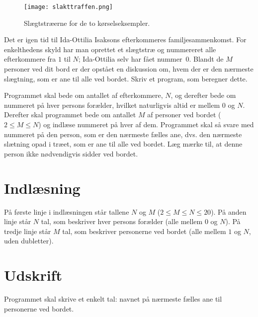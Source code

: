 \begin{figure}[h!]
  \centering
  \texttt{[image: slakttraffen.png]}
  \caption{Slægtstræerne for de to kørselseksempler.}
\end{figure}

Det er igen tid til Ida-Ottilia Isaksons efterkommeres familjesammenkomst. 
For enkelthedens skyld har man oprettet et slægtstræ og nummereret alle efterkommere fra $1$ til $N$; Ida-Ottilia selv har fået nummer~$0$.
Blandt de $M$ personer ved dit bord er der opstået en diskussion om, hvem der er den nærmeste slægtning, som er ane til alle ved bordet.
Skriv et program, som beregner dette.

Programmet skal bede om antallet af efterkommere, $N$, og derefter bede om nummeret på hver persons forælder, hvilket naturligvis altid er mellem $0$ og $N$.
Derefter skal programmet bede om antallet $M$ af personer ved bordet ($2 \le M \le N$) og indlæse nummeret på hver af dem.
Programmet skal så svare med nummeret på den person, som er den nærmeste fælles ane, dvs. den nærmeste slætning opad i træet, som er ane til alle ved bordet.
Læg mærke til, at denne person ikke nødvendigvis sidder ved bordet.

\section*{Indlæsning}
På første linje i indlæsningen står tallene $N$ og $M$ ($2 \le M \le N \le 20$).
På anden linje står $N$ tal, som beskriver hver persons forælder (alle mellem $0$ og $N$).
På tredje linje står $M$ tal, som beskriver personerne ved bordet (alle mellem $1$ og $N$, uden dubletter).

\section*{Udskrift}
Programmet skal skrive et enkelt tal: navnet på nærmeste fælles ane til personerne ved bordet.
